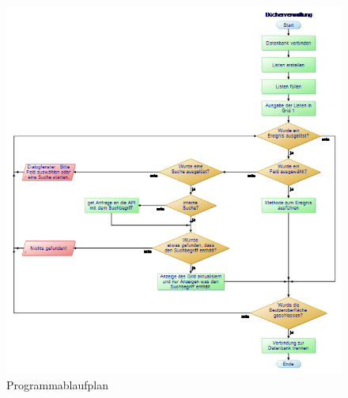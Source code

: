 \begin{figure}[h]
\begin{center}
\includegraphics[width=17cm]{img/mainpap.png}
\caption{Programmablaufplan}
\label{entwurf_pap}
\end{center}
\end{figure}





